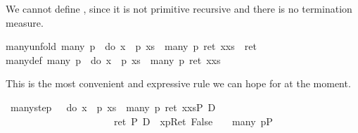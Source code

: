 \begin{isabellebody}
\begin{isamarkuptext}
We cannot define , since it is not primitive recursive 
  and there is no termination measure. 
  \label{isa:many-unfold}%
\end{isamarkuptext}%
\isamarkuptrue%
\isanewline
many{\isacharunderscore}unfold{\isacharcolon}\ {\isachardoublequote}many\ p\ {\isacharequal}\ {\isacharparenleft}{\isacharparenleft}do\ {\isacharbraceleft}x\ {\isasymleftarrow}\ p{\isacharsemicolon}\ xs\ {\isasymleftarrow}\ many\ p{\isacharsemicolon}\ ret\ {\isacharparenleft}x{\isacharhash}xs{\isacharparenright}{\isacharbraceright}{\isacharparenright}\ {\isasymparallel}\ ret\ {\isacharbrackleft}{\isacharbrackright}{\isacharparenright}{\isachardoublequote}\isanewline
\isanewline
\isamarkupfalse%
\isanewline
many{}{\isacharunderscore}def{\isacharcolon}\ {\isachardoublequote}many{}\ p\ {\isasymequiv}\ {\isacharparenleft}do\ {\isacharbraceleft}x\ {\isasymleftarrow}\ p{\isacharsemicolon}\ xs\ {\isasymleftarrow}\ many\ p{\isacharsemicolon}\ ret\ {\isacharparenleft}x{\isacharhash}xs{\isacharparenright}{\isacharbraceright}{\isacharparenright}{\isachardoublequote}\isamarkupfalse%
%
\begin{isamarkuptext}%
This is the most convenient and expressive rule we can hope for at the
   moment.%
\end{isamarkuptext}%
\isamarkuptrue%
\ many{\isacharunderscore}step{\isacharcolon}\ {\isachardoublequote}{\isasymlbrakk}\ {\isasymturnstile}\ {\isasymlangle}{\isacharparenleft}do\ {\isacharbraceleft}x\ {\isasymleftarrow}\ p{\isacharsemicolon}\ xs\ {\isasymleftarrow}\ many\ p{\isacharsemicolon}\ ret\ {\isacharparenleft}x{\isacharhash}xs{\isacharparenright}{\isacharbraceright}{\isacharparenright}{\isasymrangle}P\ {\isasymor}\isactrlsub D\ \isanewline
\ \ \ \ \ \ \ \ \ \ \ \ \ \ \ \ \ \ \ \ \ \ {\isasymlangle}ret\ {\isacharbrackleft}{\isacharbrackright}{\isasymrangle}P\ {\isasymand}\isactrlsub D\ {\isacharbrackleft}{\isacharhash}\ x{\isasymleftarrow}p{\isacharbrackright}{\isacharparenleft}Ret\ False{\isacharparenright}\ {\isasymrbrakk}\ {\isasymLongrightarrow}\ {\isasymturnstile}\ {\isasymlangle}many\ p{\isasymrangle}P{\isachardoublequote}\isamarkupfalse%
\isamarkupfalse%
\isamarkupfalse%
\isamarkupfalse%
\isamarkupfalse%
\isamarkupfalse%
\isamarkupfalse%
\isamarkupfalse%
\isamarkupfalse%
\isamarkupfalse%
\isamarkupfalse%
\isamarkupfalse%
\isamarkupfalse%
\isamarkupfalse%
\isamarkupfalse%
\isamarkupfalse%
\isamarkupfalse%
\isamarkupfalse%
\isamarkupfalse%
\isamarkupfalse%
\isamarkupfalse%
\isamarkupfalse%
\isamarkupfalse%

\end{isabellebody}
